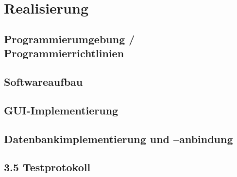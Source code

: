 \section{Realisierung}

\subsection{Programmierumgebung / Programmierrichtlinien}
\subsection{Softwareaufbau}
\subsection{GUI-Implementierung}
\subsection{Datenbankimplementierung und –anbindung}
\subsection{3.5	Testprotokoll}
